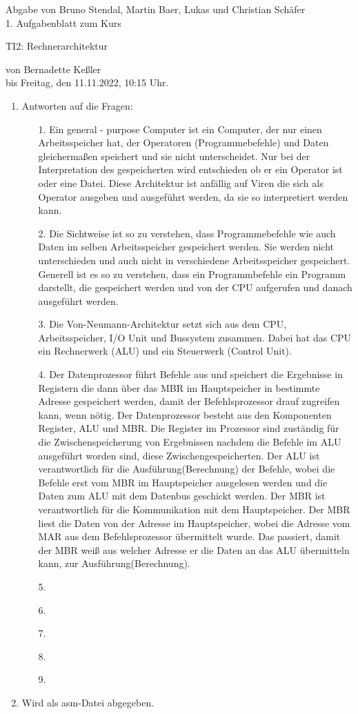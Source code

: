 \documentclass[11pt]{article}
\newcommand{\VORLESUNG}{TI2: Rechnerarchitektur}
\newcommand{\STUDENTS}{Bruno Stendal, Martin Baer, Lukas und Christian Schäfer}
\newcommand{\STAFF}{Bernadette Keßler}
\newcommand{\ASSIGNMENT}{1}
\newcommand{\DELIVER}{Freitag, den 11.11.2022, 10:15 Uhr}
\newcommand{\aufgabe}[1]{\item{\bf #1}}
\begin{document}
\ofoot{\pagemark}
\begin{center}
    Abgabe von \STUDENTS{}\\
 \ASSIGNMENT{}. Aufgabenblatt  zum Kurs 
\vspace*{0.2cm}

{\Large \VORLESUNG{}}

{\small von \STAFF{} \\ bis \DELIVER{}.}
\vspace*{0.5cm}\\
\end{center}
\begin{enumerate}
\setcounter{enumi}{0}
\aufgabe{}Antworten auf die Fragen:
\begin{enumerate}
\item[1.] Ein general - purpose Computer ist ein Computer, der nur einen Arbeitsspeicher hat, der Operatoren (Programmebefehle) und Daten gleichermaßen speichert und sie nicht unterscheidet. Nur bei der Interpretation des gespeicherten wird entschieden ob er ein Operator ist oder eine Datei. Diese Architektur ist anfällig auf Viren die sich als Operator ausgeben und ausgeführt werden, da sie so interpretiert werden kann.
\item[2.] Die Sichtweise ist so zu verstehen, dass Programmebefehle wie auch Daten im selben Arbeitsspeicher gespeichert werden. Sie werden nicht unterschieden und auch nicht in verschiedene Arbeitsspeicher gespeichert. Generell ist es so zu verstehen, dass ein Programmbefehle ein Programm darstellt, die gespeichert werden und von der CPU aufgerufen und danach ausgeführt werden.
\item[3.] Die Von-Neumann-Architektur setzt sich aus dem CPU, Arbeitsspeicher, I/O Unit und Bussystem zusammen. Dabei hat das CPU ein Rechnerwerk (ALU) und ein Steuerwerk (Control Unit).
\item[4.] Der Datenprozessor führt Befehle aus und speichert die Ergebnisse in Registern die dann über das MBR im Hauptspeicher in bestimmte Adresse gespeichert werden, damit der Befehlsprozessor drauf zugreifen kann, wenn nötig. Der Datenprozessor besteht aus den Komponenten  Register, ALU und MBR. Die Register im Prozessor sind zuständig für die Zwischenspeicherung von Ergebnissen nachdem die Befehle im ALU ausgeführt worden sind, diese Zwischengespeicherten. Der ALU ist verantwortlich für die Ausführung(Berechnung) der Befehle, wobei die Befehle erst vom MBR im Hauptspeicher ausgelesen werden und die Daten zum ALU mit dem Datenbus geschickt werden. Der MBR ist verantwortlich für die Kommunikation mit dem Hauptspeicher. Der MBR liest die Daten von der Adresse im Hauptspeicher, wobei die Adresse vom MAR aus dem Befehlsprozessor übermittelt wurde. Das passiert, damit der MBR weiß aus welcher Adresse er die Daten an das ALU übermitteln kann, zur Ausführung(Berechnung).
\item[5.]
\item[6.]
\item[7.]
\item[8.]
\item[9.]
\end{enumerate}
\aufgabe{} Wird als asm-Datei abgegeben.  
\end{enumerate}
\end{document}
